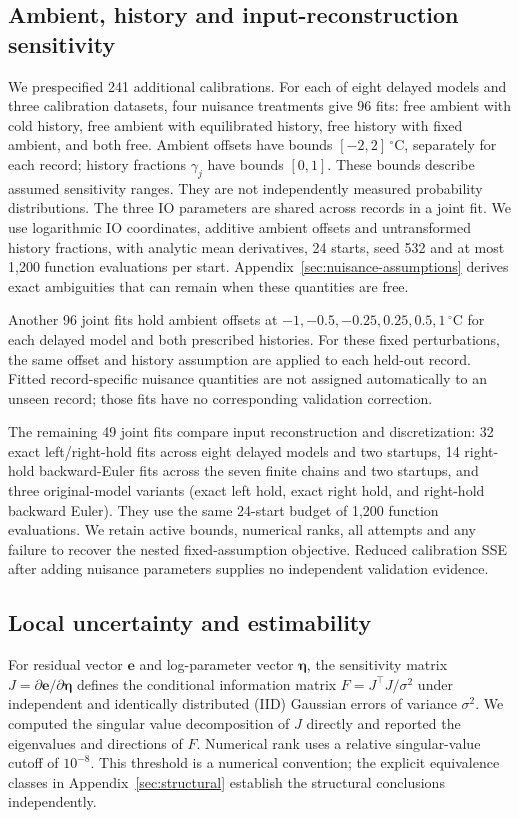 \documentclass[11pt]{article}
\begin{document}
\subsection{Ambient, history and input-reconstruction sensitivity}
We prespecified 241 additional calibrations. For each of eight delayed models
and three calibration datasets, four nuisance treatments give 96 fits:
free ambient with cold history, free ambient with equilibrated history,
free history with fixed ambient, and both free. Ambient offsets have bounds
$[-2,2]\,{}^\circ\mathrm C$, separately for each record; history fractions $\gamma_j$
have bounds $[0,1]$. These bounds describe assumed sensitivity ranges.
They are not independently measured probability distributions. The three
IO parameters are shared across records in a joint fit. We use logarithmic
IO coordinates, additive ambient offsets and untransformed history fractions,
with analytic mean derivatives, 24 starts, seed 532 and at most 1,200 function
evaluations per start. Appendix~\ref{sec:nuisance-assumptions} derives exact
ambiguities that can remain when these quantities are free.

Another 96 joint fits hold ambient offsets at
$-1,-0.5,-0.25,0.25,0.5,1\,{}^\circ\mathrm C$ for each delayed model and
both prescribed histories. For these fixed perturbations, the same offset
and history assumption are applied to each held-out record. Fitted
record-specific nuisance quantities are not assigned automatically to an unseen
record; those fits have no corresponding validation correction.

The remaining 49 joint fits compare input reconstruction and discretization:
32 exact left/right-hold fits across eight delayed models and two startups,
14 right-hold backward-Euler fits across the seven finite chains and two
startups, and three original-model variants (exact left hold, exact right hold,
and right-hold backward Euler). They use the same 24-start budget of 1,200
function evaluations. We retain active bounds, numerical ranks, all attempts
and any failure to recover the nested fixed-assumption objective. Reduced
calibration SSE after adding nuisance parameters supplies no independent
validation evidence.

\subsection{Local uncertainty and estimability}
For residual vector $\bm e$ and log-parameter vector $\bm\eta$, the sensitivity
matrix $J=\partial\bm e/\partial\bm\eta$ defines the conditional information
matrix $F=J^\top J/\sigma^2$ under independent and identically distributed (IID)
Gaussian errors of variance
$\sigma^2$. We computed the singular value decomposition of $J$ directly and
reported the eigenvalues and directions of $F$. Numerical rank uses a relative
singular-value cutoff of $10^{-8}$. This threshold is a numerical convention;
the explicit equivalence classes in Appendix~\ref{sec:structural} establish the
structural conclusions independently.
\end{document}
